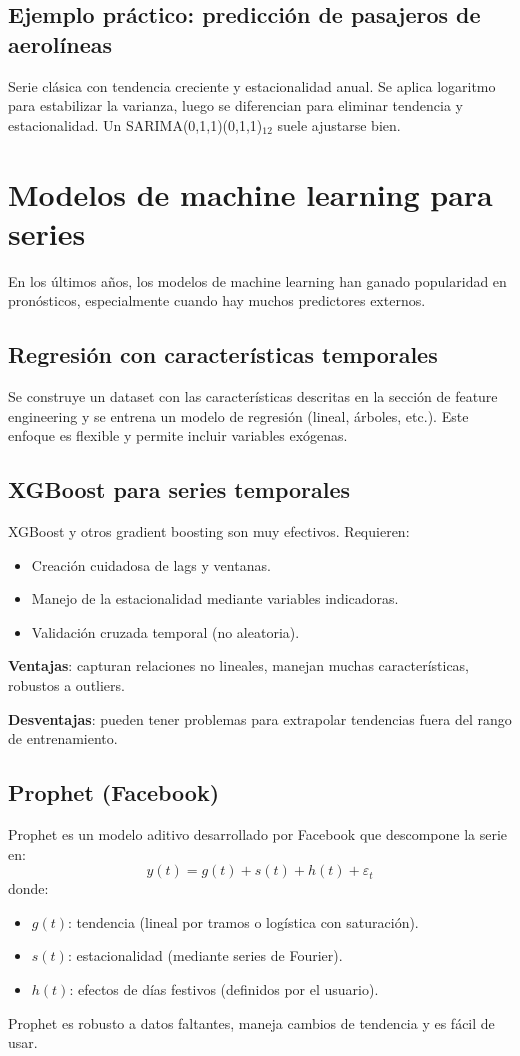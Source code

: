 \documentclass[12pt,a4paper,openany,oneside]{book}
\begin{document}
\subsection{Ejemplo práctico: predicción de pasajeros de aerolíneas}
Serie clásica con tendencia creciente y estacionalidad anual. Se aplica logaritmo para estabilizar la varianza, luego se diferencian para eliminar tendencia y estacionalidad. Un SARIMA(0,1,1)(0,1,1)\(_{12}\) suele ajustarse bien.

\section{Modelos de machine learning para series}

En los últimos años, los modelos de machine learning han ganado popularidad en pronósticos, especialmente cuando hay muchos predictores externos.

\subsection{Regresión con características temporales}
Se construye un dataset con las características descritas en la sección de feature engineering y se entrena un modelo de regresión (lineal, árboles, etc.). Este enfoque es flexible y permite incluir variables exógenas.

\subsection{XGBoost para series temporales}
XGBoost y otros gradient boosting son muy efectivos. Requieren:
\begin{itemize}
    \item Creación cuidadosa de lags y ventanas.
    \item Manejo de la estacionalidad mediante variables indicadoras.
    \item Validación cruzada temporal (no aleatoria).
\end{itemize}

\textbf{Ventajas}: capturan relaciones no lineales, manejan muchas características, robustos a outliers.

\textbf{Desventajas}: pueden tener problemas para extrapolar tendencias fuera del rango de entrenamiento.

\subsection{Prophet (Facebook)}
Prophet es un modelo aditivo desarrollado por Facebook que descompone la serie en:
\[
y(t) = g(t) + s(t) + h(t) + \varepsilon_t
\]
donde:
\begin{itemize}
    \item \(g(t)\): tendencia (lineal por tramos o logística con saturación).
    \item \(s(t)\): estacionalidad (mediante series de Fourier).
    \item \(h(t)\): efectos de días festivos (definidos por el usuario).
\end{itemize}
Prophet es robusto a datos faltantes, maneja cambios de tendencia y es fácil de usar.
\end{document}
